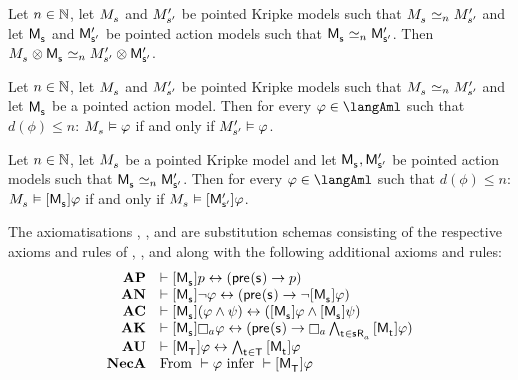 \begin{proposition}
Let $n \in \mathbb{N}$,
let $\kPModel{\kStateS}$ and ${M^{\prime}_{{s}^{\prime}}}$ be pointed Kripke models such that $\kPModel{\kStateS} \bisimilar[n] \kPModelP{\kStateSP}$ and
let $\aPModel{\aStateS}$ and ${\mathsf{M}^{\prime}_{{\mathsf{{s}}^{\prime}}}}$ be pointed action models such that $\aPModel{\aStateS} \bisimilar[n] \aPModelP{\aStateSP}$.
Then $\kPModel{\kStateS} \exec \aPModel{\aStateS} \bisimilar[n] \kPModelP{\kStateSP} \exec \aPModelP{\aStateSP}$.
\end{proposition}

\begin{proposition}
Let $n \in \mathbb{N}$,
let $\kPModel{\kStateS}$ and ${M^{\prime}_{{s}^{\prime}}}$ be pointed Kripke models such that $\kPModel{\kStateS} \bisimilar[n] \kPModelP{\kStateSP}$ and
let $\aPModel{\aStateS}$ be a pointed action model.
Then for every $\phi \in \langAml$ such that $d(\phi) \leq n$: $\kPModel{\kStateS} \entails \phi$ if and only if ${M^{\prime}_{{s}^{\prime}}} \vDash \varphi$.
\end{proposition}

\begin{proposition}
Let $n \in \mathbb{N}$,
let $\kPModel{\kStateS}$ be a pointed Kripke model and
let $\aPModel{\aStateS}, \aPModelP{\aStateSP}$ be pointed action models such that $\aPModel{\aStateS} \bisimilar[n] \aPModelP{\aStateSP}$.
Then for every $\phi \in \langAml$ such that $d(\phi) \leq n$: $\kPModel{\kStateS} \entails \actionA{\aPModel{\aStateS}} \phi$ if and only if $\kPModel{\kStateS} \entails \actionA{\aPModelP{\aStateSP}} \phi$.
\end{proposition}

\begin{definition}
The axiomatisations \axiomAmlK{}, \axiomAmlKFF{}, and \axiomAmlS{} are substitution schemas consisting of the respective axioms and rules of \axiomK{}, \axiomKFF{}, and \axiomS{} along with the following additional axioms and rules:
$$
\begin{array}{rl}
    {\bf AP} & \proves \actionA{\aPModel{\aStateS}} \atomP \iff (\aPrecondition(\aStateS) \implies \atomP)\\
    {\bf AN} & \proves \actionA{\aPModel{\aStateS}} \lnot \phi \iff (\aPrecondition(\aStateS) \implies \lnot \actionA{\aPModel{\aStateS}} \phi)\\
    {\bf AC} & \proves \actionA{\aPModel{\aStateS}} (\phi \land \psi) \iff (\actionA{\aPModel{\aStateS}} \phi \land \actionA{\aPModel{\aStateS}} \psi)\\
    {\bf AK} & \proves \actionA{\aPModel{\aStateS}} \necessaryA \phi \iff (\aPrecondition(\aStateS) \implies \necessaryA \bigwedge_{\aStateT \in \aSuccessorsA{\aStateS}} \actionA{\aPModel{\aStateT}} \phi)\\
    {\bf AU} & \proves \actionA{\aPModel{\aStatesT}} \phi \iff \bigwedge_{\aStateT \in \aStatesT} \actionA{\aPModel{\aStateT}} \phi\\
    {\bf NecA} & \text{From } \proves \phi \text{ infer } \proves \actionA{\aPModel{\aStatesT}} \phi
\end{array}
$$
\end{definition}

